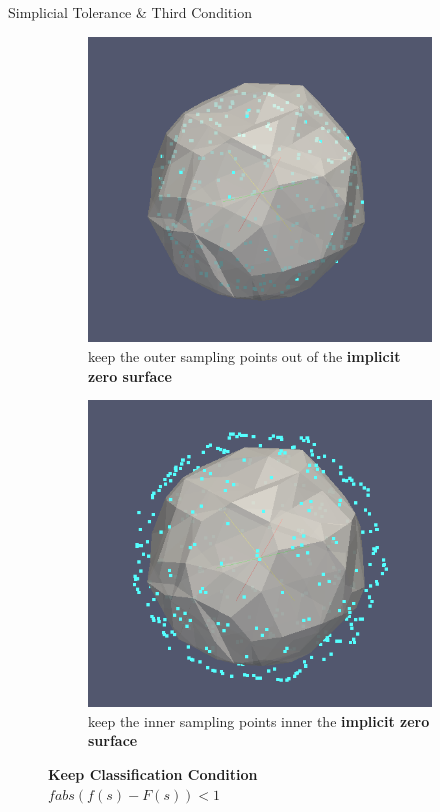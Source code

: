 \documentclass{beamer}
\begin{document}
\begin{frame} {Simplicial Tolerance \& Third Condition}
  \begin{figure}[h]
    \begin{subfigure}[b]{0.3\textwidth}
      \includegraphics[width=\textwidth]{kp_classification0}
      \caption[kp0]{keep the outer sampling points out of the \textbf{implicit zero surface}}
    \end{subfigure}
    \begin{subfigure}[b]{0.3\textwidth}
      \includegraphics[width=\textwidth]{kp_classification1}
      \caption[kp1]{keep the inner sampling points inner the \textbf{implicit zero surface}}
    \end{subfigure}
    \caption[kp]{\textbf{Keep Classification Condition}\\$fabs(f(s)-F(s))<1$}
  \end{figure}
\end{frame}
\end{document}
